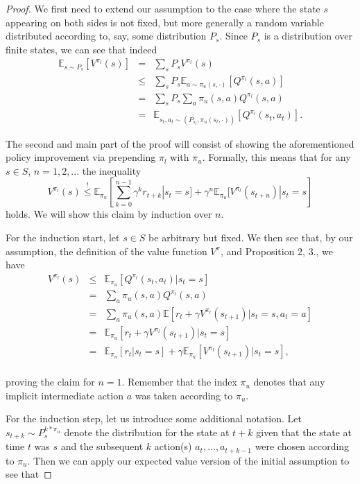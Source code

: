 \documentclass[11pt]{article} %
\begin{document}
\begin{proof}
	We first need to extend our assumption to the case where the state $s$ appearing on both sides is not fixed, but more generally a random variable distributed according to, say, some distribution $P_s$. Since $P_s$ is a distribution over finite states, we can see that indeed
	\[
		\begin{array}{rll}
			\mathbb{E}_{s \sim P_s}[V^{\pi_l}(s)] & = & \sum_s P_s V^{\pi_l}(s) \\
				& \le & \sum_s P_s \mathbb{E}_{a \sim \pi_u(s,\cdot)}[Q^{\pi_l}(s,a)] \\
				& = & \sum_s P_s \sum_a \pi_u(s,a) Q^{\pi_l}(s,a) \\
				& = & \mathbb{E}_{s_t ,a_t \sim (P_{s_t},\pi_u(s_t,\cdot))}[Q^{\pi_l}(s_t,a_t)].
		\end{array}
	\]

	The second and main part of the proof will consist of showing the aforementioned policy improvement via prepending $\pi_l$ with $\pi_u$. Formally, this means that for any $s \in S$, $n = 1,2,...$ the inequality $$ V^{\pi_l}(s) \overset{!}{\le} \mathbb{E}_{\pi_u}\left[\sum_{k=0}^{n-1} \gamma^k r_{t+k} | s_t = s] + \gamma^n \mathbb{E}_{\pi_u}[V^{\pi_l}(s_{t+n}) | s_t = s\right] $$ holds. We will show this claim by induction over $n$.

	For the induction start, let $s \in S$ be arbitrary but fixed. We then see that, by our assumption, the definition of the value function $V^{\pi}$, and Proposition 2, 3., we have
	\[
		\begin{array}{rll}
			V^{\pi_l}(s) &	\le 	&	\mathbb{E}_{\pi_u}[Q^{\pi_l}(s_t,a_t) | s_t = s] \\
						&	=	&	\sum_a \pi_u(s,a) Q^{\pi_l}(s,a) \\
						&	=	&	\sum_a \pi_u(s,a) \mathbb{E}[r_t + \gamma V^{\pi_l}(s_{t+1}) | s_t = s, a_t = a]\\
						&	= 	&	\mathbb{E}_{\pi_u}[r_t + \gamma V^{\pi_l}(s_{t+1}) | s_t = s] \\
						&	=	&	\mathbb{E}_{\pi_u}[r_t | s_t = s] + \gamma \mathbb{E}_{\pi_u}[V^{\pi_l}(s_{t+1}) | s_t = s], \\
		\end{array}
	\]

	proving the claim for $n = 1$. Remember that the index $\pi_u$ denotes that any implicit intermediate action $a$ was taken according to $\pi_u$. 

	For the induction step, let us introduce some additional notation. Let $s_{t+k} \sim P_{s}^{k * \pi_u}$ denote the distribution for the state at $t+k$ given that the state at time $t$ was $s$ and the subsequent $k$ action(s) $a_t,\dots,a_{t+k-1}$ were chosen according to $\pi_u$. Then we can apply our expected value version of the initial assumption to see that


\end{proof}
\end{document}

